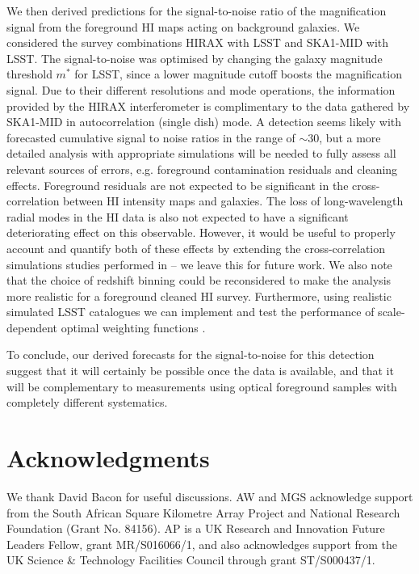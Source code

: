 \documentclass[useAMS,usenatbib]{mnras}
\begin{document}
We then derived predictions for the signal-to-noise ratio of the magnification signal from the foreground HI maps acting on background galaxies. We considered the survey combinations HIRAX with LSST and SKA1-MID with LSST. The signal-to-noise was optimised by changing the galaxy magnitude threshold $m^*$ for LSST, since a lower magnitude cutoff boosts the magnification signal.
Due to their different resolutions and mode operations, the information provided by the HIRAX interferometer is complimentary to the data gathered by SKA1-MID in autocorrelation (single dish) mode. A detection seems likely with forecasted cumulative signal to noise ratios in the range of $\sim 30$, but a more detailed analysis with appropriate simulations  will be needed to fully assess all relevant sources of errors, e.g. foreground contamination residuals and cleaning effects. Foreground residuals are not expected to be significant in the cross-correlation between HI intensity maps and galaxies. The loss of long-wavelength radial modes in the HI data is also not expected to have a significant deteriorating effect on this observable.
However, it would be useful to properly account and quantify both of these effects by extending the cross-correlation simulations studies performed in \citet{Witzemann:2018cdx, Cunnington:2019lvb,Cunnington:2018zxg} -- we leave this for future work.
We also note that the choice of redshift binning could be reconsidered to make the analysis more realistic for a foreground cleaned HI survey. Furthermore, using realistic simulated LSST catalogues we can implement and test the performance of scale-dependent optimal weighting functions \citep{Yang:2011gj}.

To conclude,
our derived forecasts for the signal-to-noise for this detection suggest that it will certainly be possible once the data is available, and that it will be complementary to measurements using optical foreground samples with completely different systematics.

\section*{Acknowledgments}
We thank David Bacon for useful discussions.
AW and MGS acknowledge support from the South African Square Kilometre Array Project and National Research Foundation (Grant No. 84156).
AP is a UK Research and Innovation Future Leaders Fellow, grant MR/S016066/1, and also acknowledges support from the UK Science \& Technology Facilities Council through grant ST/S000437/1.



\end{document}

